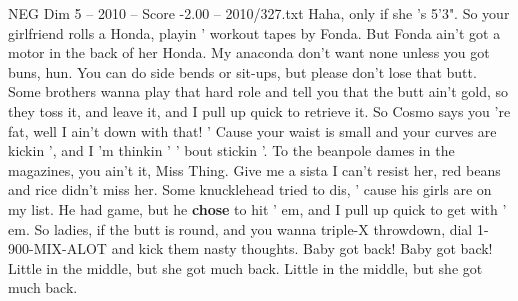 \begin{textsample}{NEG Dim 5 – 2010 – Score -2.00 – 2010/327.txt}
Haha, only if she 's 5'3".
So your girlfriend rolls a Honda, playin ' workout tapes by Fonda.
But Fonda ain't got a motor in the back of her Honda.
My anaconda don't want none unless you got buns, hun.
You can do side bends or sit-ups, but please don't lose that butt.
Some brothers wanna play that hard role and tell you that the butt ain't gold, so they toss it, and leave it, and I pull up quick to retrieve it.
So Cosmo says you 're fat, well I ain't down with that! ' Cause your waist is small and your curves are kickin ', and I 'm thinkin ' ' bout stickin '.
To the beanpole dames in the magazines, you ain't it, Miss Thing.
Give me a sista I can't resist her, red beans and rice didn't miss her.
Some knucklehead tried to dis, ' cause his girls are on my list.
He had game, but he \textbf{chose} to hit ' em, and I pull up quick to get with ' em.
So ladies, if the butt is round, and you wanna triple-X throwdown, dial 1-900-MIX-ALOT and kick them nasty thoughts.
Baby got back!
Baby got back!
Little in the middle, but she got much back.
Little in the middle, but she got much back.

\end{textsample}
